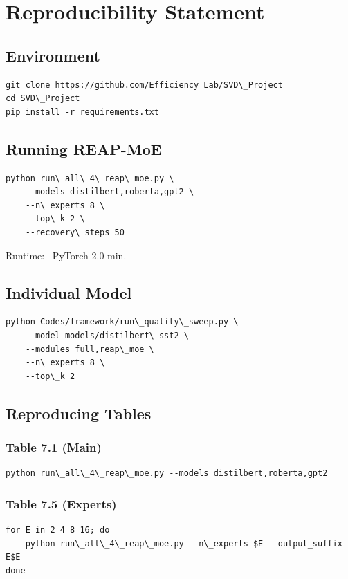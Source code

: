 \section{Reproducibility Statement}

\subsection{Environment}

\begin{lstlisting}
git clone https://github.com/Efficiency Lab/SVD\_Project
cd SVD\_Project
pip install -r requirements.txt
\end{lstlisting}

\subsection{Running REAP-MoE}

\begin{lstlisting}
python run\_all\_4\_reap\_moe.py \
    --models distilbert,roberta,gpt2 \
    --n\_experts 8 \
    --top\_k 2 \
    --recovery\_steps 50
\end{lstlisting}

Runtime: ~PyTorch 2.0 min.

\subsection{Individual Model}

\begin{lstlisting}
python Codes/framework/run\_quality\_sweep.py \
    --model models/distilbert\_sst2 \
    --modules full,reap\_moe \
    --n\_experts 8 \
    --top\_k 2
\end{lstlisting}

\subsection{Reproducing Tables}

\subsubsection{Table 7.1 (Main)}
\begin{lstlisting}
python run\_all\_4\_reap\_moe.py --models distilbert,roberta,gpt2
\end{lstlisting}

\subsubsection{Table 7.5 (Experts)}
\begin{lstlisting}
for E in 2 4 8 16; do
    python run\_all\_4\_reap\_moe.py --n\_experts $E --output_suffix E$E
done
\end{lstlisting}

